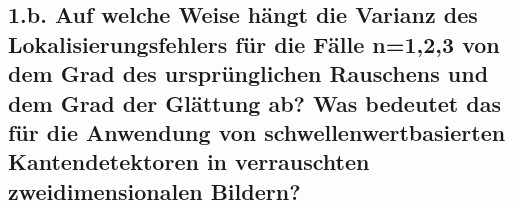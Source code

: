 \subsection*{1.b. Auf welche Weise h\"angt die Varianz des Lokalisierungsfehlers f\"ur die F\"alle n=1,2,3 von dem Grad des urspr\"unglichen Rauschens und dem Grad der Gl\"attung ab? Was bedeutet das f\"ur die Anwendung von schwellenwertbasierten Kantendetektoren in verrauschten zweidimensionalen Bildern?}
